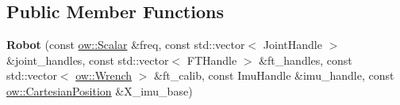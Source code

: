\subsection*{Public Member Functions}
\begin{DoxyCompactItemize}
\item 
{\bfseries Robot} (const \hyperlink{types_8h_ac412879ee4a239c8032aa2d647f4a74a}{ow\+::\+Scalar} \&freq, const std\+::vector$<$ Joint\+Handle $>$ \&joint\+\_\+handles, const std\+::vector$<$ F\+T\+Handle $>$ \&ft\+\_\+handles, const std\+::vector$<$ \hyperlink{classow__core_1_1Wrench}{ow\+::\+Wrench} $>$ \&ft\+\_\+calib, const Imu\+Handle \&imu\+\_\+handle, const \hyperlink{classow__core_1_1CartesianPosition}{ow\+::\+Cartesian\+Position} \&X\+\_\+imu\+\_\+base)\hypertarget{classow__hw__interface_1_1Robot_af499021874fd5d07070ef8af1379a503}{}\label{classow__hw__interface_1_1Robot_af499021874fd5d07070ef8af1379a503}


\end{DoxyCompactItemize}
